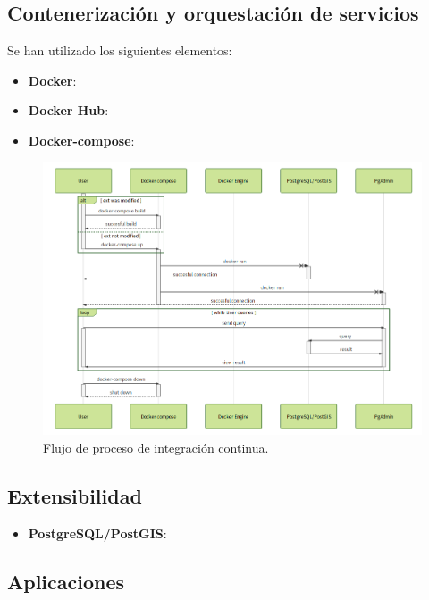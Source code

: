 \subsection{Contenerización y orquestación de servicios}





Se han utilizado los siguientes elementos:
\begin{itemize}
\item\textbf{Docker}: 
\item\textbf{Docker Hub}: 
\item\textbf{Docker-compose}: 
\end{itemize}




\begin{figure}
\begin{center}
\includegraphics[width=\textwidth]{Metodologia/Figs/ci.png}
\caption{Flujo de proceso de integración continua. \label{fig:ci}}
\end{center}
\end{figure}


\subsection{Extensibilidad}



\begin{itemize}
\item\textbf{PostgreSQL/PostGIS}: 
\end{itemize}

\subsection{Aplicaciones}



